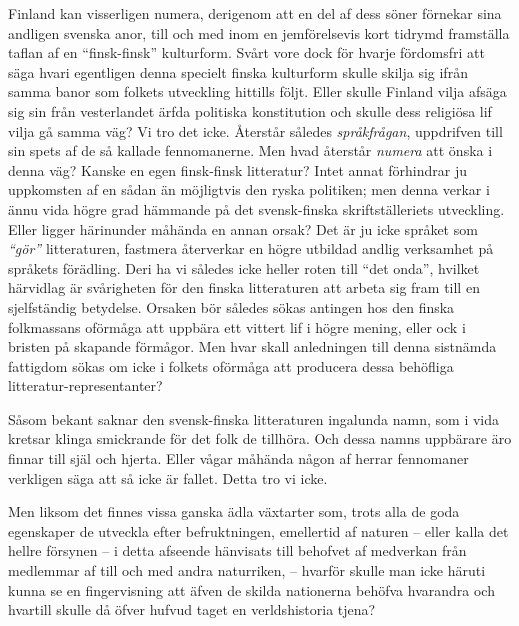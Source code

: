 Finland kan visserligen numera, derigenom att en del af dess söner
förnekar sina andligen svenska anor, till och med inom en jemförelsevis
kort tidrymd framställa taflan af en ``finsk-finsk'' kulturform. Svårt
vore dock för hvarje fördomsfri att säga hvari egentligen denna specielt
finska kulturform skulle skilja sig ifrån samma banor som folkets
utveckling hittills följt. Eller skulle Finland vilja afsäga sig sin
från vesterlandet ärfda politiska konstitution och skulle dess religiösa
lif vilja gå samma väg? Vi tro det icke. Återstår således
\emph{språkfrågan}, uppdrifven till sin spets af de så kallade
fennomanerne. Men hvad återstår \emph{numera} att önska i denna väg?
Kanske en egen finsk-finsk litteratur? Intet annat förhindrar ju
uppkomsten af en sådan än möjligtvis den ryska politiken; men denna
verkar i ännu vida högre grad hämmande på det svensk-finska
skriftställeriets utveckling. Eller ligger härinunder måhända en annan
orsak? Det är ju icke språket som \emph{``gör''} litteraturen, fastmera
återverkar en högre utbildad andlig verksamhet på språkets förädling.
Deri ha vi således icke heller roten till ``det onda'', hvilket
härvidlag är svårigheten för den finska litteraturen att arbeta sig fram
till en sjelfständig betydelse. Orsaken bör således sökas antingen hos
den finska folkmassans oförmåga att uppbära ett vittert lif i högre
mening, eller ock i bristen på skapande förmågor. Men hvar skall
anledningen till denna sistnämda fattigdom sökas om icke i folkets
oförmåga att producera dessa behöfliga litteratur-representanter?

Såsom bekant saknar den svensk-finska litteraturen ingalunda namn, som i
vida kretsar klinga smickrande för det folk de tillhöra. Och dessa namns
uppbärare äro finnar till själ och hjerta. Eller vågar måhända någon af
herrar fennomaner verkligen säga att så icke är fallet. Detta tro vi
icke.

Men liksom det finnes vissa ganska ädla växtarter som, trots alla de
goda egenskaper de utveckla efter befruktningen, emellertid af naturen
-- eller kalla det hellre försynen -- i detta afseende hänvisats till
behofvet af medverkan från medlemmar af till och med andra naturriken,
-- hvarför skulle man icke häruti kunna se en fingervisning att äfven de
skilda nationerna behöfva hvarandra och hvartill skulle då öfver hufvud
taget en verldshistoria tjena?

